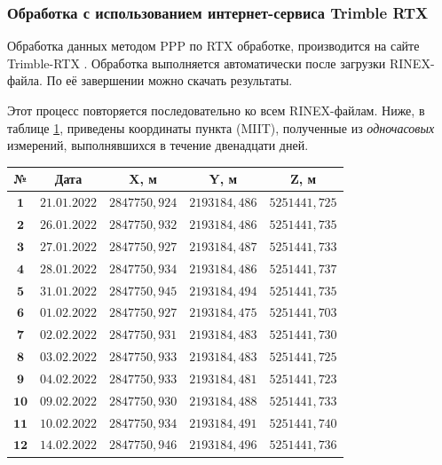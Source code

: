 \subsubsection{Обработка с использованием интернет-сервиса Trimble RTX }\label{subsec:ch2/sec3/sub1/sub1}

Обработка данных методом PPP по RTX обработке, производится на сайте Trimble-RTX \cite{src44}. Обработка выполняется автоматически после загрузки RINEX-файла. По её завершении можно скачать результаты.

Этот процесс повторяется последовательно ко всем RINEX-файлам. Ниже, в таблице \cref{tab:tab04}, приведены координаты пункта (MIIT), полученные из \textit{одночасовых} измерений, выполнявшихся в течение двенадцати дней.

\begin{table} [h!]
	\centering\small
	\label{tab:tab04}{%
		\begin{tabular}{|c|c|c|c|c|}
			\hline
			\textbf{№} & \textbf{Дата} & \textbf{X, м} & \textbf{Y, м} & \textbf{Z, м} \\
			\hline
			\textbf{ $\mathbf{1}$} & $21.01.2022$ & $2847750,924$ & $2193184,486$ & $5251441,725$ \\
			\hline
			\textbf{ $\mathbf{2}$} & $26.01.2022$ & $2847750,932$ & $2193184,486$ & $5251441,735$ \\
			\hline
			\textbf{ $\mathbf{3}$} & $27.01.2022$ & $2847750,927$ & $2193184,487$ & $5251441,733$ \\
			\hline
			\textbf{ $\mathbf{4}$} & $28.01.2022$ & $2847750,934$ & $2193184,486$ & $5251441,737$ \\
			\hline
			\textbf{ $\mathbf{5}$} & $31.01.2022$ & $2847750,945$ & $2193184,494$ & $5251441,735$ \\
			\hline
			\textbf{ $\mathbf{6}$} & $01.02.2022$ & $2847750,927$ & $2193184,475$ & $5251441,703$ \\
			\hline
			\textbf{ $\mathbf{7}$} & $02.02.2022$ & $2847750,931$ & $2193184,483$ & $5251441,730$ \\
			\hline
			\textbf{ $\mathbf{8}$} & $03.02.2022$ & $2847750,933$ & $2193184,483$ & $5251441,725$ \\
			\hline
			\textbf{ $\mathbf{9}$} & $04.02.2022$ & $2847750,933$ & $2193184,481$ & $5251441,723$ \\
			\hline
			\textbf{$\mathbf{10}$} & $09.02.2022$ & $2847750,930$ & $2193184,488$ & $5251441,733$ \\
			\hline
			\textbf{$\mathbf{11}$} & $10.02.2022$ & $2847750,934$ & $2193184,491$ & $5251441,740$ \\
			\hline
			\textbf{$\mathbf{12}$} & $14.02.2022$ & $2847750,946$ & $2193184,496$ & $5251441,736$ \\
			\hline
		\end{tabular}
	}
\end{table}

